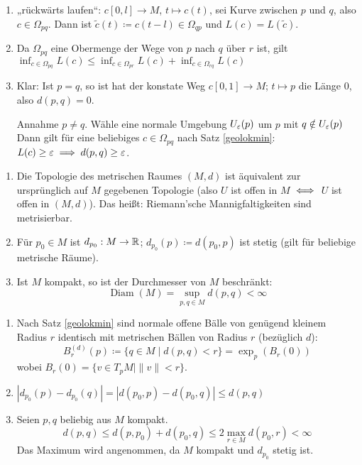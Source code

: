 \documentclass[a4paper,twoside,DIV15,BCOR12mm]{scrbook}
\renewcommand{\da}{\coloneqq}
\begin{document}
\begin{beweis}
\begin{enumerate}
\item „rückwärts laufen“: $c[0,l]\to M$, $t\mapsto c(t)$, sei Kurve zwischen $p$ und $q$, also $c\in \Omega_{pq}$. Dann ist $\tilde c(t) \da c(t-l) \in \Omega_{qp}$ und $L(c) = L(\tilde c)$.
\item Da $\Omega_{pq}$ eine Obermenge der Wege von $p$ nach $q$ über $r$ ist, gilt $\inf_{c\in\Omega_{pq}} L(c) \le \inf_{c\in\Omega_{pr}} L(c) + \inf_{c\in\Omega_{rq}} L(c)$
\item Klar: Ist $p=q$, so ist hat der konstate Weg $c[0,1]\to M$; $t\mapsto p$ die Länge 0, also $d(p,q)=0$.

Annahme $p\ne q$. Wähle eine normale Umgebung $U_\varepsilon(p)$ um $p$ mit $q\notin U_\varepsilon(p)$ Dann gilt für eine beliebiges $c\in \Omega_{pq}$ nach Satz \ref{geolokmin}: $L(c) \ge \varepsilon \implies d(p,q) \ge \varepsilon$.
\end{enumerate}
\end{beweis}

\begin{korrolar}
\begin{enumerate}
\item  Die Topologie des metrischen Raumes $(M,d)$ ist äquivalent zur ursprünglich auf $M$ gegebenen Topologie (also $U$ ist offen in $M$ $\iff$ $U$ ist offen in $(M,d)$). Das heißt: Riemann’sche Mannigfaltigkeiten sind metrisierbar.
\item Für $p_0\in M$ ist $d_{p_0}: M \to \mathbb{R}$; $d_{p_0}(p) \da d(p_0,p)$ ist stetig (gilt für beliebige metrische Räume).
\item Ist $M$ kompakt, so ist der Durchmesser von $M$ beschränkt: \[ \operatorname{Diam}(M) = \sup_{p,q\in M} d(p,q) < \infty \]
\end{enumerate}
\end{korrolar}

\begin{beweis}
\begin{enumerate}
\item Nach Satz \ref{geolokmin} sind normale offene Bälle von genügend kleinem Radius $r$ identisch mit metrischen Bällen von Radius $r$ (bezüglich $d$):
\[
B_r^{(d)}(p) \da \{q\in M \mid d(p,q) < r\} = \exp_p(B_r(0))
\] wobei $B_r(0) = \{ v\in T_pM \mid \| v\|< r\}$.
\item $|d_{p_0}(p) - d_{p_0}(q)| = |d(p_0,p) - d(p_0,q)| \le d(p,q)$
\item Seien $p,q$ beliebig aus $M$ kompakt.
\[
d(p,q) \le d(p,p_0) + d(p_0,q) \le 2 \max_{r\in M} d(p_0,r) < \infty
\]
Das Maximum wird angenommen, da $M$ kompakt und $d_{p_0}$ stetig ist.
\end{enumerate}
\end{beweis}
\end{document}
